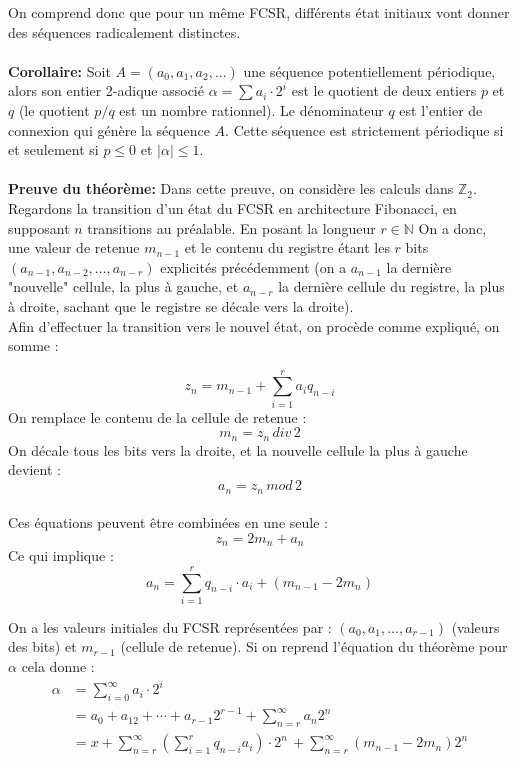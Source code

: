 \documentclass[11pt]{report}
\begin{document}
	On comprend donc que pour un même FCSR, différents état initiaux vont donner des séquences radicalement distinctes. 
	\\
	\\
	\textbf{Corollaire:}
	Soit $A=(a_0,a_1,a_2,...)$ une séquence potentiellement périodique, alors son entier 2-adique associé $\alpha = \sum a_i \cdot 2^i$ est le quotient de deux entiers $p$ et $q$ (le quotient $p/q$ est un nombre rationnel). Le dénominateur $q$ est l'entier de connexion qui génère la séquence $A$. Cette séquence est strictement périodique si et seulement si $p \leq 0$ et $|\alpha| \leq 1$.
	\\
	\\
	\textbf{Preuve du théorème:}
	Dans cette preuve, on considère les calculs dans $\mathbb{Z}_2$. Regardons la transition d'un état du FCSR en architecture Fibonacci, en supposant $n$ transitions au préalable. En posant la longueur $r \in \mathbb{N}$ On a donc, une valeur de retenue $m_{n-1}$ et le contenu du registre étant les $r$ bits $(a_{n-1},a_{n-2},...,a_{n-r})$ explicités précédemment (on a $a_{n-1}$ la dernière "nouvelle" cellule, la plus à gauche, et $a_{n-r}$ la dernière cellule du registre, la plus à droite, sachant que le registre se décale vers la droite). 
	\\
	Afin d'effectuer la transition vers le nouvel état, on procède comme expliqué, on somme : 
	
	\[
		z_n = m_{n-1} + \sum_{i=1}^{r} a_iq_{n-i}
	\]
On remplace le contenu de la cellule de retenue : $$m_n = z_n\, div\, 2$$
On décale tous les bits vers la droite, et la nouvelle cellule la plus à gauche devient : 
$$a_n = z_n \, mod \, 2$$
\\
Ces équations peuvent être combinées en une seule :
$$z_n = 2m_n + a_n$$
Ce qui implique : 
$$a_n = \sum_{i=1}^r q_{n-i} \cdot a_i+(m_{n-1}-2m_n)$$

On a les valeurs initiales du FCSR représentées par : $(a_0,a_1,...,a_{r-1})$ (valeurs des bits) et $m_{r-1}$ (cellule de retenue). 
Si on reprend l'équation du théorème pour $\alpha$ cela donne :
\begin{align*}
\alpha &= \sum_{i=0}^\infty a_i \cdot 2^i\\
	&=	a_0 + a_12 + \cdots + a_{r-1}2^{r-1} + 		\sum_{n=r}^\infty a_n2^n\\
	&= x + \sum_{n=r}^\infty(\sum_{i=1}^r q_{n-i}a_i) \cdot 2^n \, + \sum_{n=r}^\infty (m_{n-1} - 2m_n)2^n\\
\end{align*}
\end{document}
